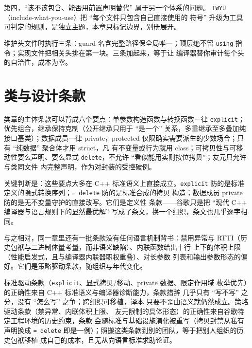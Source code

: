 \documentclass[12pt,a4paper,fontset=fandol]{ctexbook}
\newcommand{\Tp}[1]{\texttt{#1}}
\newcommand{\Lang}[1]{\textsf{#1}}
\newcommand{\CPP}{\Lang{C++}}
\begin{document}
第四，``该不该包含、能否用前置声明替代'' 属于另一个体系的问题。
\Tp{IWYU}（include-what-you-use）把 ``每个文件只包含自己直接使用的
符号'' 升级为工具可判定的规则，是独立主题，本章只标记边界，别册展开。

\begin{bestpractice}[title={把依赖缺陷变成编译错误}]
维护头文件时执行三条：guard 名含完整路径保全局唯一；顶层绝不留
\Tp{using} 指令；实现文件把相关头排在第一块。三条加起来，等于让
编译器替你审计每个头的自洽性，成本为零。
\end{bestpractice}

\section{类与设计条款}
\label{sec:ch02-classes}

类章的主体条款可以背成六个要点：单参数构造函数与转换函数一律
\Tp{explicit}；优先组合，继承保持克制（公开继承只用于 ``是一个''
关系，多重继承至多叠加纯接口基类）；数据成员一律 private，protected
仅限确实需要派生的少数场合；只有 ``纯数据'' 聚合体才用 struct，凡
有不变量或行为就用 class；可拷贝性与可移动性要么声明、要么显式
\Tp{delete}，不允许 ``看似能用实则按位拷贝''；友元只允许与类同文件
内完整声明，作为对封装的受控破例。

关键判断是：这些要点大多在 \CPP{} 标准语义上直接成立。\Tp{explicit}
防的是标准定义的隐式转换序列；\Tp{= delete} 防的是标准合成的拷贝
构造；数据成员 private 防的是无不变量守护的直接改写。它们是定义性
条款——谷歌只是把 ``现代 \CPP{} 编译器与语言规则下的显然最优解''
写成了条文，换一个组织，条文也几乎逐字相同。

与之相对，同一章里还有一批条款没有任何语言机制背书：禁用异常与
RTTI（历史包袱与二进制体量考量，而非语义缺陷）、内联函数给出十行
上下的体积上限（性能启发式，且与编译器内联器职权重叠）、对长参数
列表和输出参数形态的偏好。它们是策略驱动条款，随组织与年代变化。

\begin{compare}[title={标准驱动条款与策略驱动条款}]
标准驱动条款（\Tp{explicit}、显式拷贝/移动、private 数据、限定作用域
枚举优先）的正确性来自 \CPP{} 标准语义与编译器诊断能力，条款措辞
几乎只有 ``写不写'' 之分，没有 ``怎么写'' 之争；跨组织可移植，译本
只要不歪曲语义就仍然成立。策略驱动条款（禁异常、内联体积上限、
友元限制的具体形态）的正确性来自谷歌特定工程环境的历史约束，条款
会随标准与基础设施演化被重写（拷贝封禁从私有声明换成 \Tp{= delete}
即是一例）；照搬这类条款到别的团队，等于把别人组织的历史包袱移植
成自己的成本，且无从向语言标准求助论证。
\end{compare}
\end{document}
